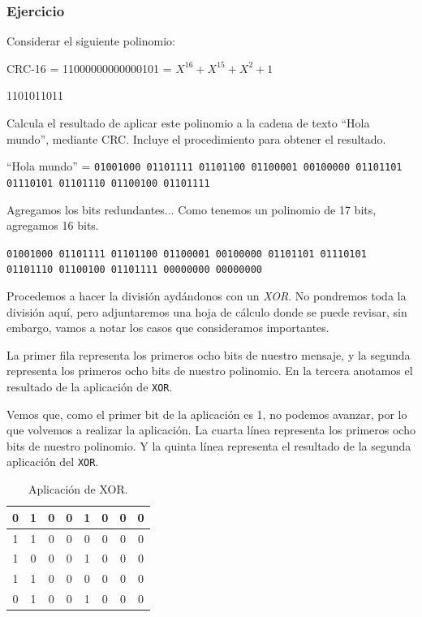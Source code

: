 \documentclass[spanish,12pt,letterpaper]{article}
\begin{document}
\subsubsection{Ejercicio}

Considerar el siguiente polinomio:

CRC-16 = 11000000000000101 = $X^{16} + X^{15} + X^{2}+ 1$

1101011011

Calcula el resultado de aplicar este polinomio a la cadena de texto ``Hola
mundo'', mediante CRC. Incluye el procedimiento para obtener el resultado.

``Hola mundo'' = \texttt{01001000 01101111 01101100 01100001 00100000 01101101
  01110101 01101110 01100100 01101111}

Agregamos los bits redundantes... Como tenemos un polinomio de 17 bits, agregamos
16 bits.

\texttt{01001000 01101111 01101100 01100001 00100000 01101101 01110101 01101110
  01100100 01101111 00000000 00000000}

Procedemos a hacer la división aydándonos con un \textit{XOR}. No pondremos toda
la división aquí, pero adjuntaremos una hoja de cálculo donde se puede revisar,
sin embargo, vamos a notar los casos que consideramos importantes.

La primer fila representa los primeros ocho bits de nuestro mensaje, y la segunda
representa los primeros ocho bits de nuestro polinomio. En la tercera anotamos el
resultado de la aplicación de \texttt{XOR}.

Vemos que, como el primer bit de la aplicación es 1, no podemos avanzar, por lo
que volvemos a realizar la aplicación. La cuarta línea representa los primeros
ocho bits de nuestro polinomio. Y la quinta línea representa el resultado de la
segunda aplicación del \texttt{XOR}.

\begin{table}[H]
  \centering
  \begin{tabular}{| c | c | c | c | c | c | c | c |}\hline
    0 & 1 & 0 & 0 & 1 & 0 & 0 & 0 \\ \hline
    1 & 1 & 0 & 0 & 0 & 0 & 0 & 0 \\ \hline
    1 & 0 & 0 & 0 & 1 & 0 & 0 & 0 \\ \hline
    1 & 1 & 0 & 0 & 0 & 0 & 0 & 0 \\ \hline
    0 & 1 & 0 & 0 & 1 & 0 & 0 & 0 \\ \hline
  \end{tabular}
  \caption{Aplicación de XOR.}
\end{table}
\end{document}
